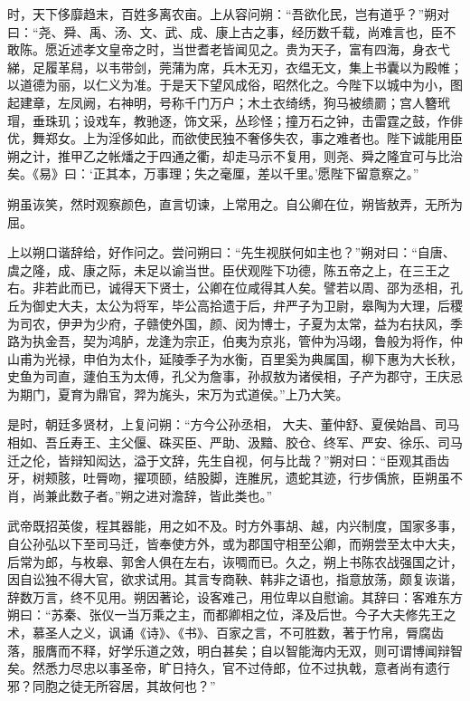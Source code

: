 \documentclass[12pt,UTF8]{ctexbook}
\begin{document}
时，天下侈靡趋末，百姓多离农亩。上从容问朔：“吾欲化民，岂有道乎？”朔对曰：“尧、舜、禹、汤、文、武、成、康上古之事，经历数千载，尚难言也，臣不敢陈。愿近述孝文皇帝之时，当世耆老皆闻见之。贵为天子，富有四海，身衣弋綈，足履革舄，以韦带剑，莞蒲为席，兵木无刃，衣缊无文，集上书囊以为殿帷；以道德为丽，以仁义为准。于是天下望风成俗，昭然化之。今陛下以城中为小，图起建章，左凤阙，右神明，号称千门万户；木土衣绮绣，狗马被缋罽；宫人簪玳瑁，垂珠玑；设戏车，教驰逐，饰文采，丛珍怪；撞万石之钟，击雷霆之鼓，作俳优，舞郑女。上为淫侈如此，而欲使民独不奢侈失农，事之难者也。陛下诚能用臣朔之计，推甲乙之帐燔之于四通之衢，却走马示不复用，则尧、舜之隆宜可与比治矣。《易》曰：‘正其本，万事理；失之毫厘，差以千里。’愿陛下留意察之。”



朔虽诙笑，然时观察颜色，直言切谏，上常用之。自公卿在位，朔皆敖弄，无所为屈。



上以朔口谐辞给，好作问之。尝问朔曰：“先生视朕何如主也？”朔对曰：“自唐、虞之隆，成、康之际，未足以谕当世。臣伏观陛下功德，陈五帝之上，在三王之右。非若此而已，诚得天下贤士，公卿在位咸得其人矣。譬若以周、邵为丞相，孔丘为御史大夫，太公为将军，毕公高拾遗于后，弁严子为卫尉，皋陶为大理，后稷为司农，伊尹为少府，子赣使外国，颜、闵为博士，子夏为太常，益为右扶风，季路为执金吾，契为鸿胪，龙逢为宗正，伯夷为京兆，管仲为冯翊，鲁般为将作，仲山甫为光禄，申伯为太仆，延陵季子为水衡，百里奚为典属国，柳下惠为大长秋，史鱼为司直，蘧伯玉为太傅，孔父为詹事，孙叔敖为诸侯相，子产为郡守，王庆忌为期门，夏育为鼎官，羿为旄头，宋万为式道侯。”上乃大笑。



是时，朝廷多贤材，上复问朔：“方今公孙丞相，大夫、董仲舒、夏侯始昌、司马相如、吾丘寿王、主父偃、硃买臣、严助、汲黯、胶仓、终军、严安、徐乐、司马迁之伦，皆辩知闳达，溢于文辞，先生自视，何与比哉？”朔对曰：“臣观其臿齿牙，树颊胲，吐脣吻，擢项颐，结股脚，连脽尻，遗蛇其迹，行步偊旅，臣朔虽不肖，尚兼此数子者。”朔之进对澹辞，皆此类也。”



武帝既招英俊，程其器能，用之如不及。时方外事胡、越，内兴制度，国家多事，自公孙弘以下至司马迁，皆奉使方外，或为郡国守相至公卿，而朔尝至太中大夫，后常为郎，与枚皋、郭舍人俱在左右，诙啁而已。久之，朔上书陈农战强国之计，因自讼独不得大官，欲求试用。其言专商鞅、韩非之语也，指意放荡，颇复诙谐，辞数万言，终不见用。朔因著论，设客难己，用位卑以自慰谕。其辞曰：客难东方朔曰：“苏秦、张仪一当万乘之主，而都卿相之位，泽及后世。今子大夫修先王之术，慕圣人之义，讽诵《诗》、《书》、百家之言，不可胜数，著于竹帛，脣腐齿落，服膺而不释，好学乐道之效，明白甚矣；自以智能海内无双，则可谓博闻辩智矣。然悉力尽忠以事圣帝，旷日持久，官不过侍郎，位不过执戟，意者尚有遗行邪？同胞之徒无所容居，其故何也？”
\end{document}

